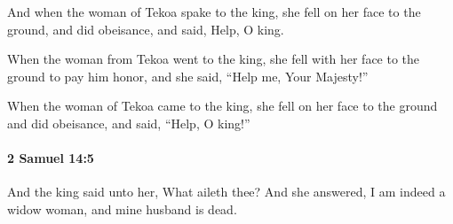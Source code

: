 			\begin{versebox}
					\item[BHS] 
					\item[ASV] And when the woman of Tekoa spake to the king, she fell on her face to the ground, and did obeisance, and said, Help, O king.
					\item[NIV] When the woman from Tekoa went to the king, she fell with her face to the ground to pay him honor, and she said, “Help me, Your Majesty!”
					\item[NRSV] When the woman of Tekoa came to the king, she fell on her face to the ground and did obeisance, and said, “Help, O king!”
			\end{versebox}

		\paragraph{2 Samuel 14:5} %
			\label{2SAMUEL-14-5}

			And the king said unto her, What aileth thee? And she answered, I am indeed a widow woman, and mine husband is dead.

